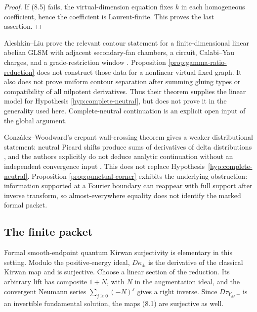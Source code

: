 \begin{proof}
If (8.5) fails, the virtual-dimension equation fixes \(k\) in each homogeneous
coefficient, hence the coefficient is Laurent-finite.  This proves the last
assertion.
\end{proof}

\begin{remark}
\label{rem:neutral-boundary}
Aleshkin--Liu prove the relevant contour statement for a
finite-dimensional linear abelian GLSM with adjacent secondary-fan chambers,
a circuit, Calabi--Yau charges, and a grade-restriction window
\cite[Definition~5.18 and Theorem~5.21]{AleshkinLiu}.  Proposition
\ref{prop:gamma-ratio-reduction} does not construct those data for a nonlinear
virtual fixed graph.  It also does not prove uniform contour separation after
summing gluing types or compatibility of all nilpotent derivatives.  Thus
their theorem supplies the linear model for Hypothesis
\ref{hyp:complete-neutral}, but does not prove it in the generality used
here.  Complete-neutral continuation is an explicit open input of the global
argument.

Gonz\'alez--Woodward's crepant wall-crossing theorem gives a weaker
distributional statement: neutral Picard shifts produce sums of derivatives
of delta distributions
\cite[Remark~1.18(d), Remark~4.6, and equation~(47)]{GonzalezWoodward},
and the authors explicitly do not deduce analytic continuation without an
independent convergence input \cite[Remark~4.7]{GonzalezWoodward}.  This does not replace
Hypothesis~\ref{hyp:complete-neutral}.  Proposition
\ref{prop:punctual-corner} exhibits the underlying obstruction: information
supported at a Fourier boundary can reappear with full support after inverse
transform, so almost-everywhere equality does not identify the marked formal
packet.
\end{remark}

\subsection{The finite packet}

Formal smooth-endpoint quantum Kirwan surjectivity is elementary in this
setting.  Modulo the positive-energy ideal, \(D\kappa_\pm\) is the derivative
of the classical Kirwan map and is surjective.  Choose a linear section of
the reduction.  Its arbitrary lift has composite \(1+N\), with \(N\) in the
augmentation ideal, and the convergent Neumann series
\(\sum_{j\geq0}(-N)^j\) gives a right inverse.  Since
\(D\tau_{Y_\pm,-}\) is an invertible fundamental solution, the maps (8.1)
are surjective as well.


